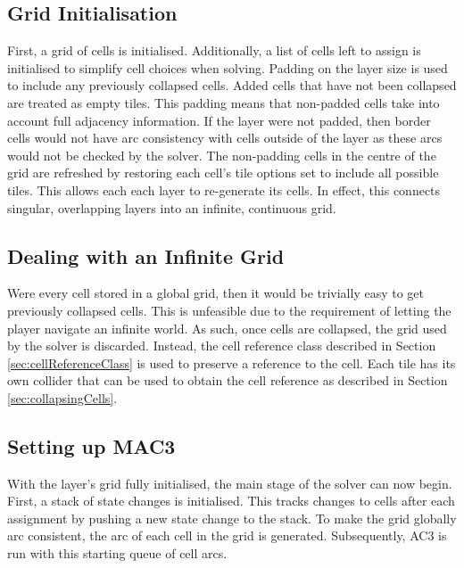 \subsection{Grid Initialisation}
First, a grid of cells is initialised. Additionally, a list of cells left to assign is initialised to simplify cell choices when solving. Padding on the layer size is used to include any previously collapsed cells. Added cells that have not been collapsed are treated as empty tiles. This padding means that non-padded cells take into account full adjacency information. If the layer were not padded, then border cells would not have arc consistency with cells outside of the layer as these arcs would not be checked by the solver. The non-padding cells in the centre of the grid are refreshed by restoring each cell's tile options set to include all possible tiles. This allows each each layer to re-generate its cells. In effect, this connects singular, overlapping layers into an infinite, continuous grid.%

\subsection{Dealing with an Infinite Grid}
Were every cell stored in a global grid, then it would be trivially easy to get previously collapsed cells. This is unfeasible due to the requirement of letting the player navigate an infinite world. As such, once cells are collapsed, the grid used by the solver is discarded. Instead, the cell reference class described in Section \ref{sec:cellReferenceClass} is used to preserve a reference to the cell. Each tile has its own collider that can be used to obtain the cell reference as described in Section \ref{sec:collapsingCells}.%

\subsection{Setting up MAC3}
With the layer's grid fully initialised, the main stage of the solver can now begin. First, a stack of state changes is initialised. This tracks changes to cells after each assignment by pushing a new state change to the stack. To make the grid globally arc consistent, the arc of each cell in the grid is generated. Subsequently, AC3 is run with this starting queue of cell arcs.

